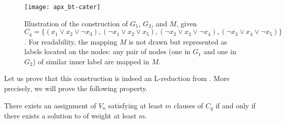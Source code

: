 		\begin{figure}[ht]
    	 	 \centering
    	 	 \texttt{[image: apx\_bt-cater]}
    	 	 \caption{Illustration of the construction of $G_1$, $G_2$, and $M$, given $C_q = \{(x_1 \vee x_2 \vee \neg{}x_3), (\neg{}x_1 \vee x_2 \vee x_5), (\neg{}x_2 \vee x_3 \vee \neg{}x_4), (\neg{}x_3 \vee x_4 \vee \neg{}x_5)\}$. For readability, the mapping $M$ is not drawn but represented as labels located on the nodes: any pair of nodes (one in $G_1$ and one in $G_2$) of similar inner label are mapped in $M$.}
			\label{fig:bt-cater}
		\end{figure}

		Let us prove that this construction is indeed an L-reduction from \msat{}. More precisely, we will prove the following property.
		\begin{lemma}
		There exists an assignment of $V_n$ satisfying at least $m$ clauses of $C_q$ if and only if there exists a solution to \mwccs{} of weight at least $m$.
		\end{lemma}

